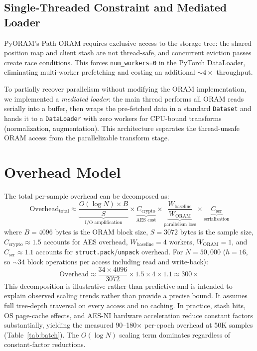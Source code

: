 \documentclass{llncs}
\begin{document}
\subsection{Single-Threaded Constraint and Mediated Loader}

PyORAM's Path ORAM requires exclusive access to the storage tree: the shared position map and client stash are not thread-safe, and concurrent eviction passes create race conditions.
This forces \texttt{num\_workers=0} in the PyTorch DataLoader, eliminating multi-worker prefetching and costing an additional ${\sim}4\times$ throughput.

To partially recover parallelism without modifying the ORAM implementation, we implemented a \emph{mediated loader}: the main thread performs all ORAM reads serially into a buffer, then wraps the pre-fetched data in a standard \texttt{Dataset} and hands it to a \texttt{DataLoader} with zero workers for CPU-bound transforms (normalization, augmentation).
This architecture separates the thread-unsafe ORAM access from the parallelizable transform stage.

\section{Overhead Model}
\label{sec:model}

The total per-sample overhead can be decomposed as:
\[
\text{Overhead}_{\text{total}} \approx \underbrace{\frac{O(\log N) \times B}{S}}_{\text{I/O amplification}} \times \underbrace{C_{\text{crypto}}}_{\text{AES cost}} \times \underbrace{\frac{W_{\text{baseline}}}{W_{\text{ORAM}}}}_{\text{parallelism loss}} \times \underbrace{C_{\text{ser}}}_{\text{serialization}}
\]
where $B = 4096$ bytes is the ORAM block size, $S = 3072$ bytes is the sample size, $C_{\text{crypto}} \approx 1.5$ accounts for AES overhead, $W_{\text{baseline}} = 4$ workers, $W_{\text{ORAM}} = 1$, and $C_{\text{ser}} \approx 1.1$ accounts for \texttt{struct.pack}/\texttt{unpack} overhead.
For $N = 50{,}000$ ($h = 16$, so ${\sim}34$ block operations per access including read and write-back):
\[
\text{Overhead} \approx \frac{34 \times 4096}{3072} \times 1.5 \times 4 \times 1.1 \approx 300\times
\]
This decomposition is illustrative rather than predictive and is intended to explain observed scaling trends rather than provide a precise bound.
It assumes full tree-depth traversal on every access and no caching.
In practice, stash hits, OS page-cache effects, and AES-NI hardware acceleration reduce constant factors substantially, yielding the measured 90--180$\times$ per-epoch overhead at 50K samples (Table~\ref{tab:batch}).
The $O(\log N)$ scaling term dominates regardless of constant-factor reductions.
\end{document}
